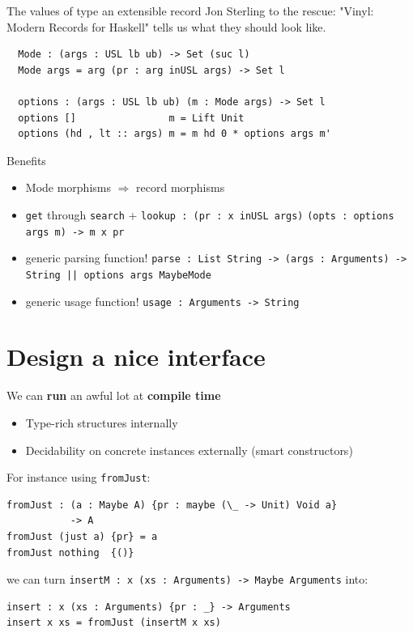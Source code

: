 \documentclass[dvipsnames]{beamer}
\begin{document}
\begin{frame}[fragile]{The values of type an extensible record}
  Jon Sterling to the rescue: "Vinyl: Modern Records for Haskell" tells
  us what they should look like.

\begin{verbatim}
  Mode : (args : USL lb ub) -> Set (suc l)
  Mode args = arg (pr : arg inUSL args) -> Set l

  options : (args : USL lb ub) (m : Mode args) -> Set l
  options []                m = Lift Unit
  options (hd , lt :: args) m = m hd 0 * options args m'
\end{verbatim}
\end{frame}

\begin{frame}[fragile]{Benefits}
  \begin{itemize}
    \item Mode morphisms $\Rightarrow$ record morphisms
    \item \texttt{get} through \texttt{search} +
          \texttt{lookup : (pr : x inUSL args)}
          \texttt{(opts : options args m) -> m x pr}
    \item generic parsing function!
          \texttt{parse : List String -> (args : Arguments) ->}
          \texttt{String || options args MaybeMode}
    \item generic usage function!
          \texttt{usage : Arguments -> String}
  \end{itemize}

\end{frame}

\section{Design a nice interface}
\begin{frame}[fragile]{We can \textbf{run} an awful lot at \textbf{compile time}}

  \begin{itemize}
    \item Type-rich structures internally
    \item Decidability on concrete instances externally (smart constructors)
  \end{itemize}

  For instance using \texttt{fromJust}:

\begin{verbatim}
fromJust : (a : Maybe A) {pr : maybe (\_ -> Unit) Void a}
           -> A
fromJust (just a) {pr} = a
fromJust nothing  {()}
\end{verbatim}

  we can turn \texttt{insertM : x (xs : Arguments) -> Maybe Arguments}
  into:

\begin{verbatim}
insert : x (xs : Arguments) {pr : _} -> Arguments
insert x xs = fromJust (insertM x xs)
\end{verbatim}
\end{frame}
\end{document}
